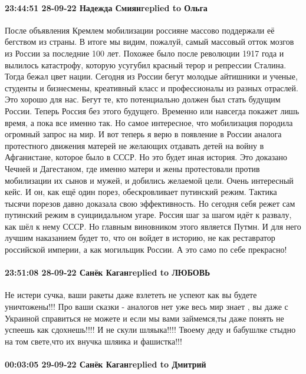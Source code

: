 \paragraph{23:44:51 28-09-22 Надежда Смиянreplied to Ольга}

После объявления Кремлем мобилизации россияне массово поддержали её бегством из страны. В итоге мы видим, пожалуй, самый массовый отток мозгов из России за последние 100 лет. Похожее было после революции 1917 года и вылилось катастрофу, которую усугубил красный терор и репрессии Сталина. Тогда бежал цвет нации.
Сегодня из России бегут молодые айтишники и ученые, студенты и бизнесмены, креативный класс и профессионалы из разных отраслей. Это хорошо для нас. Бегут те, кто потенциально должен был стать будущим России. Теперь Россия без этого будущего. Временно или навсегда покажет лишь время, а пока все именно так.
Но самое интересное, что мобилизация породила огромный запрос на мир. И вот теперь я верю в появление в России аналога протестного движения матерей не желающих отдавать детей на войну в Афганистане, которое было в СССР. Но это будет иная история. Это доказано Чечней и Дагестаном, где именно матери и жены протестовали против мобилизации их сынов и мужей, и добились желаемой цели. Очень интересный кейс. И он, как ещё один порез, обескровливает путинский режим. Тактика тысячи порезов давно доказала свою эффективность. Но сегодня себя режет сам путинский режим в суициидальном угаре.
Россия шаг за шагом идёт к развалу, как шёл к нему СССР. Но главным виновником этого является Путмн. И для него лучшим наказанием будет то, что он войдет в историю, не как реставратор российской империи, а как могильщик России. А это само по себе прекрасно!

\paragraph{23:51:08 28-09-22 Санёк Каганreplied to ЛЮБОВЬ}

Не истери сучка, ваши ракеты даже взлететь не успеют как вы будете
уничтожены!!! Про ваши сказки - аналогов нет уже весь мир знает , вы даже с
Украиной справиться не можете и если мы вами займемся,ты даже понять не успеешь
как сдохнешь!!!! И не скули шляыка!!!! Твоему деду и бабушлке стыдно на том
свете,что их внучка шляика и фашистка!!!

\paragraph{00:03:05 29-09-22 Санёк Каганreplied to Дмитрий}

